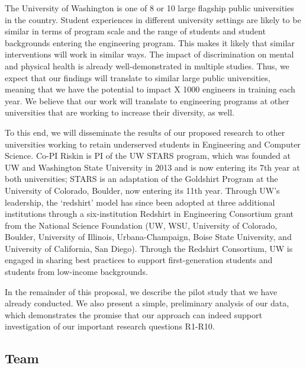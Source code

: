 The University of Washington is one of 8 or 10 large flagship public universities in the country.  Student experiences in different university settings are likely to be similar in terms of program scale and the range of students and student backgrounds entering the engineering program. This makes it likely that similar interventions will work in similar ways. The impact of discrimination on mental and physical health is already well-demonstrated in multiple studies. Thus, we expect that our findings will translate to similar large public universities, meaning that we have the potential to impact X 1000 engineers in training each year. We believe that our work will translate to engineering programs at other universities that are working to increase their diversity, as well. 

To this end, we will disseminate the results of our proposed research to other universities working to retain underserved students in Engineering and Computer Science.  Co-PI Riskin is PI of the UW STARS program, which was founded at UW and Washington State University in 2013 and is now entering its 7th year at both universities;  STARS is an adaptation of the Goldshirt Program at the University of Colorado, Boulder, now entering its 11th year. Through UW’s leadership, the `redshirt' model has since been adopted at three additional institutions through a six-institution Redshirt in Engineering Consortium grant from the National Science Foundation (UW, WSU, University of Colorado, Boulder, University of Illinois, Urbana-Champaign, Boise State University, and University of California, San Diego). Through the Redshirt Consortium, UW is engaged in sharing best practices to support first-generation students and students from low-income backgrounds. 

In the remainder of this proposal, we describe the pilot study that we have already conducted. We also present a simple, preliminary analysis of our data, which demonstrates the promise that our approach can indeed support investigation of our important research questions R1-R10.
 
\subsection{Team}
 
